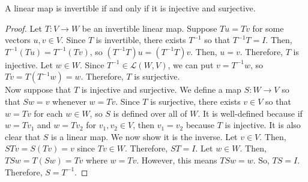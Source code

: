 \documentclass{article}
\begin{document}
\begin{theorem}
  \label{thm:invertible-iff-injective-surjective}
  A linear map is invertible if and only if it is injective and surjective.
\end{theorem}
\begin{proof}
  Let $T: V \rightarrow W$ be an invertible linear map. Suppose $Tu =
  Tv$ for some vectors $u, v \in V$. Since $T$ is invertible, there
  exists $T^{-1}$ so that $T^{-1}T = I$. Then, $T^{-1}(Tu) =
  T^{-1}(Tv)$, so $(T^{-1}T)u = (T^{-1}T)v$. Then, $u = v$. Therefore,
  $T$ is injective. Let $w \in W$. Since $T^{-1} \in \mathcal{L}(W,
  V)$, we can put $v = T^{-1}w$, so $Tv = T(T^{-1}w) = w$. Therefore,
  $T$ is surjective. \\
  Now suppose that $T$ is injective and surjective. We define a map
  $S: W \rightarrow V$ so that $Sw = v$ whenever $w = Tv$. Since $T$
  is surjective, there exists $v \in V$ so that $w = Tv$ for each $w
  \in W$, so $S$ is defined over all of $W$. It is well-defined
  because if $w = Tv_1$ and $w = Tv_2$ for $v_1, v_2 \in V$, then $v_1
  = v_2$ because $T$ is injective. It is also clear that $S$ is a
  linear map. We now show it is the inverse. Let $v \in V$. Then, $STv
  = S(Tv) = v$ since $Tv \in W$. Therefore, $ST = I$. Let $w \in
  W$. Then, $TSw = T(Sw) = Tv$ where $w = Tv$. However, this means
  $TSw = w$. So, $TS = I$. Therefore, $S = T^{-1}$.
\end{proof}
\end{document}
